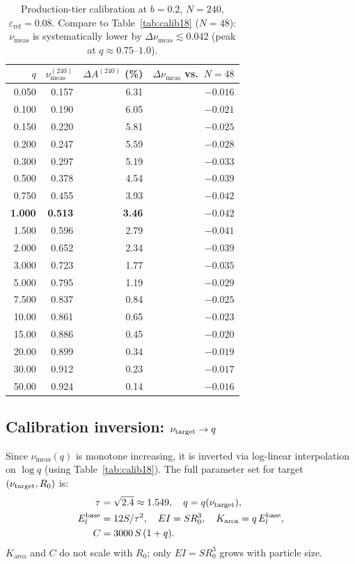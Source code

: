 \documentclass[aps,pre,twocolumn,floatfix,longbibliography]{revtex4-2}
\newcommand{\Elb}{E_l^{\mathrm{base}}}
\newcommand{\Karea}{K_{\mathrm{area}}}
\newcommand{\numes}{\nu_{\mathrm{meas}}}
\newcommand{\dA}{\Delta A}
\newcommand{\eref}{\varepsilon_{\mathrm{ref}}}
\begin{document}
\begin{table}[htb]
\caption{Production-tier calibration at $b = 0.2$, $N = 240$, $\eref = 0.08$.
  Compare to Table~\ref{tab:calib18} ($N = 48$): $\numes$ is systematically
  lower by $\Delta\numes \lesssim 0.042$ (peak at $q \approx 0.75$--$1.0$).}
\label{tab:calib240}
\begin{ruledtabular}
\begin{tabular}{rrrr}
  $q$ & $\numes^{(240)}$ & $\dA^{(240)}$ (\%) & $\Delta\numes$ vs.\ $N\!=\!48$ \\
\hline
  0.050 & 0.157 & 6.31 & $-0.016$ \\
  0.100 & 0.190 & 6.05 & $-0.021$ \\
  0.150 & 0.220 & 5.81 & $-0.025$ \\
  0.200 & 0.247 & 5.59 & $-0.028$ \\
  0.300 & 0.297 & 5.19 & $-0.033$ \\
  0.500 & 0.378 & 4.54 & $-0.039$ \\
  0.750 & 0.455 & 3.93 & $-0.042$ \\
  \textbf{1.000} & \textbf{0.513} & \textbf{3.46} & $\mathbf{-0.042}$ \\
  1.500 & 0.596 & 2.79 & $-0.041$ \\
  2.000 & 0.652 & 2.34 & $-0.039$ \\
  3.000 & 0.723 & 1.77 & $-0.035$ \\
  5.000 & 0.795 & 1.19 & $-0.029$ \\
  7.500 & 0.837 & 0.84 & $-0.025$ \\
  10.00 & 0.861 & 0.65 & $-0.023$ \\
  15.00 & 0.886 & 0.45 & $-0.020$ \\
  20.00 & 0.899 & 0.34 & $-0.019$ \\
  30.00 & 0.912 & 0.23 & $-0.017$ \\
  50.00 & 0.924 & 0.14 & $-0.016$ \\
\end{tabular}
\end{ruledtabular}
\end{table}

\subsection{Calibration inversion: $\nu_{\rm target} \to q$}

Since $\numes(q)$ is monotone increasing, it is inverted via log-linear
interpolation on $\log q$ (using Table~\ref{tab:calib18}).  The full parameter
set for target $(\nu_{\rm target}, R_0)$ is:
\begin{align}
  \tau &= \sqrt{2.4} \approx 1.549,
  \quad q = q(\nu_{\rm target}),
  \label{eq:recipe1}\\
  \Elb &= 12S/\tau^2,
  \quad EI = SR_0^3,
  \quad \Karea = q\,\Elb,
  \label{eq:recipe2}\\
  C &= 3000\,S\,(1 + q).
  \label{eq:recipe3}
\end{align}
$\Karea$ and $C$ do not scale with $R_0$; only $EI = SR_0^3$ grows with
particle size.
\end{document}
